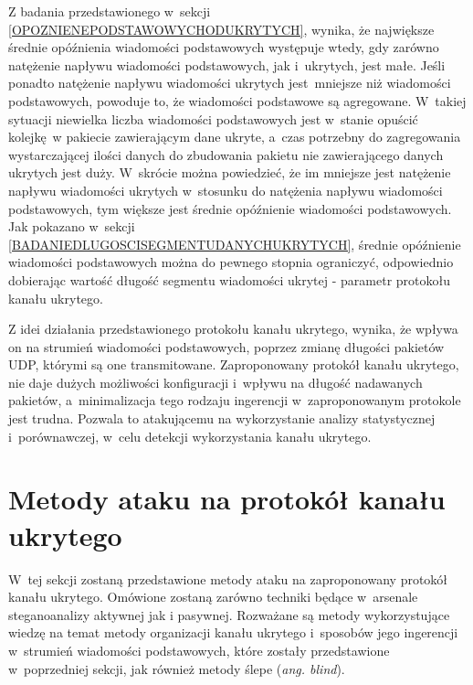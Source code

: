 \documentclass[a4paper, twoside, 12pt]{report}
\begin{document}
        Z badania przedstawionego w~sekcji \ref{OPOZNIENEPODSTAWOWYCHODUKRYTYCH},
        wynika, że największe średnie opóźnienia wiadomości podstawowych
        występuje wtedy, gdy zarówno natężenie napływu wiadomości podstawowych, jak i~ukrytych, jest małe.
        Jeśli ponadto natężenie napływu wiadomości ukrytych jest mniejsze niż wiadomości podstawowych,
        powoduje to, że wiadomości podstawowe są agregowane.
        W~takiej sytuacji niewielka liczba wiadomości podstawowych jest w~stanie
        opuścić kolejkę w pakiecie zawierającym dane ukryte, a~czas potrzebny do
        zagregowania wystarczającej ilości danych do zbudowania pakietu nie
        zawierającego danych ukrytych jest duży. W~skrócie można powiedzieć, że
        im mniejsze jest natężenie napływu wiadomości ukrytych w~stosunku do natężenia
        napływu wiadomości podstawowych, tym większe jest średnie opóźnienie wiadomości podstawowych.
        Jak pokazano w~sekcji \ref{BADANIEDLUGOSCISEGMENTUDANYCHUKRYTYCH},
        średnie opóźnienie wiadomości podstawowych można do pewnego stopnia ograniczyć, odpowiednio
        dobierając wartość długość segmentu wiadomości ukrytej - parametr protokołu
        kanału ukrytego.

        Z idei działania przedstawionego protokołu kanału ukrytego, wynika, że wpływa on na strumień
        wiadomości podstawowych, poprzez zmianę długości pakietów UDP, którymi są one transmitowane.
        Zaproponowany protokół kanału ukrytego, nie daje dużych możliwości konfiguracji i~wpływu
        na długość nadawanych pakietów, a~minimalizacja tego rodzaju ingerencji
        w~zaproponowanym protokole jest trudna. Pozwala to atakującemu
        na wykorzystanie analizy statystycznej i~porównawczej, w~celu detekcji
        wykorzystania kanału ukrytego.

    \section{Metody ataku na protokół kanału ukrytego}
       W~tej sekcji zostaną przedstawione metody ataku na zaproponowany protokół kanału ukrytego. Omówione
       zostaną zarówno techniki będące w~arsenale steganoanalizy aktywnej jak i
       pasywnej. Rozważane są metody wykorzystujące wiedzę na temat metody organizacji kanału ukrytego
       i~sposobów jego ingerencji w~strumień wiadomości podstawowych, które zostały
       przedstawione w~poprzedniej sekcji, jak również metody ślepe (\emph{ang. blind}).
\end{document}
